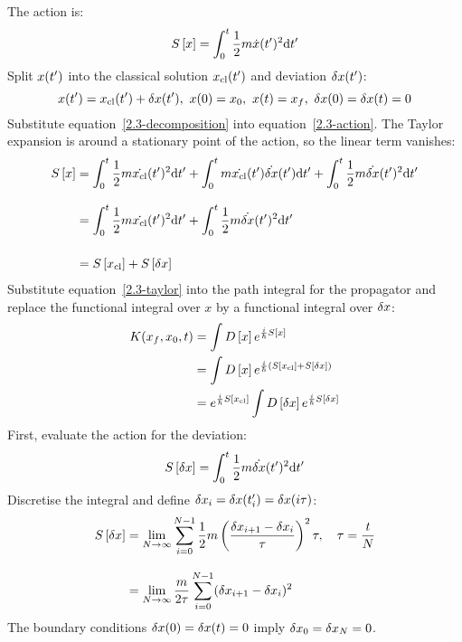The action is:
\begin{equation}
  \label{2.3-action}
  S\left[{x}\right] = \int_{0}^{t} \frac{1}{2} m \dot{x}(t^\prime)^2 \text{d}t^\prime
\end{equation}
Split $x(t^\prime)$ into the classical solution $x_{\text{cl}}(t^\prime)$ and deviation $\delta{x}(t^\prime)$:
\begin{equation}
  \label{2.3-decomposition}
  x(t^\prime) = x_{\text{cl}}(t^\prime) + \delta{x}(t^\prime),\
  x(0) = x_0,\
  x(t) = x_f,\
  \delta{x}(0) = \delta{x}(t) = 0
\end{equation}
Substitute equation~\ref{2.3-decomposition} into equation~\ref{2.3-action}.
The Taylor expansion is around a stationary point of the action, so the linear
term vanishes:
\begin{align}
  \label{2.3-taylor}
  S\left[{x}\right]
   & =
  \int_{0}^{t} \frac{1}{2} m \dot{x_{\text{cl}}}(t^\prime)^2 \text{d}t^\prime +
  \int_{0}^{t} m \dot{x_{\text{cl}}}(t^\prime)\dot{\delta{x}}(t^\prime) \text{d}t^\prime +
  \int_{0}^{t} \frac{1}{2} m \dot{\delta{x}}(t^\prime)^2 \text{d}t^\prime
  \nonumber
  \\[2ex]
   & =
  \int_{0}^{t} \frac{1}{2} m \dot{x_{\text{cl}}}(t^\prime)^2 \text{d}t^\prime +
  \int_{0}^{t} \frac{1}{2} m \dot{\delta{x}}(t^\prime)^2 \text{d}t^\prime
  \nonumber
  \\[3ex]
   & =
  S\left[{x_{\text{cl}}}\right] + S\left[{\delta{x}}\right]
\end{align}
Substitute equation~\ref{2.3-taylor} into the path integral for the propagator and
replace the functional integral over $x$ by a functional integral over $\delta{x}$:
\begin{align}
  K(x_f, x_0, t)
   & = \int D\left[{x}\right] e^{\frac{i}{\hbar} S\left[{x}\right]} \nonumber
  \\
   & = \int D\left[{x}\right] e^{\frac{i}{\hbar} (S\left[{x_{\text{cl}}}\right] + S\left[{\delta{x}}\right])} \nonumber
  \\
  \label{2.3-propagator}
   & = e^{\frac{i}{\hbar} S\left[{x_{\text{cl}}}\right]} \int D\left[{\delta{x}}\right] e^{\frac{i}{\hbar} S\left[{\delta{x}}\right]}
\end{align}
First, evaluate the action for the deviation:
\begin{equation*}
  S\left[{\delta{x}}\right] = \int_{0}^{t} \frac{1}{2} m \dot{\delta{x}}(t^\prime)^2 \text{d}t^\prime
\end{equation*}
Discretise the integral and define $\delta{x}_i = \delta{x}(t^\prime_i) = \delta{x}(i\tau)$:
\begin{align*}
  S\left[{\delta{x}}\right]
   & =
  \lim_{N \to \infty} \sum_{i=0}^{N-1} \frac{1}{2} m \left(\frac{\delta{x}_{i+1} - \delta{x}_i}{\tau}\right)^2 \tau
  ,\quad
  \tau = \frac{t}{N}
  \\[2ex]
   & =
  \lim_{N \to \infty} \frac{m}{2\tau} \sum_{i=0}^{N-1} (\delta{x}_{i+1}-\delta{x}_i)^2
\end{align*}
The boundary conditions $\delta{x}(0) = \delta{x}(t) = 0$ imply $\delta{x}_0 = \delta{x}_N = 0$.

